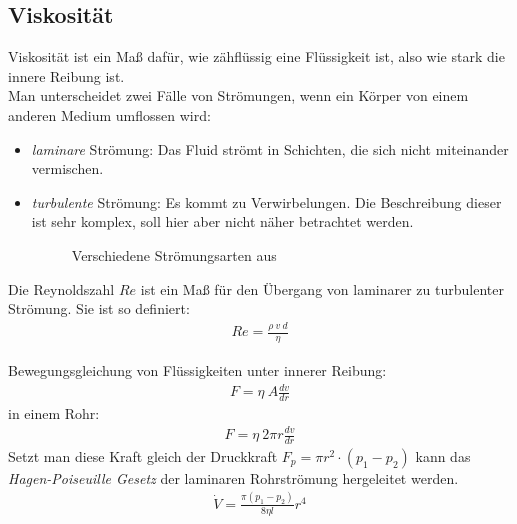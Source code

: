 \documentclass[12pt,a4paper,titlepage,headinclude,bibtotoc]{scrartcl}
\begin{document}
\subsection{Viskosität}
Viskosität ist ein Maß dafür, wie zähflüssig eine Flüssigkeit ist, also wie stark die innere Reibung ist.\\
Man unterscheidet zwei Fälle von Strömungen, wenn ein Körper von einem anderen Medium  umflossen wird:
\begin{itemize}
	\item \textit{laminare} Strömung: Das Fluid strömt in Schichten, die sich nicht miteinander vermischen. %
	\item \textit{turbulente} Strömung: Es kommt zu Verwirbelungen. Die Beschreibung dieser ist sehr komplex, soll hier aber nicht näher betrachtet werden.
\begin{figure}[htb]
  \centering
  \hfill
  \caption{Verschiedene Strömungsarten aus \cite[S. 465]{giancoli}}
  \label{fig:label-gesamt}
\end{figure}
\end{itemize}
Die Reynoldszahl $Re$ ist ein Maß für den Übergang von laminarer zu turbulenter Strömung.
Sie ist so definiert:
\begin{align}
	Re=\frac{\rho~v~d}{\eta}
\end{align}

Bewegungsgleichung von Flüssigkeiten unter innerer Reibung:
\begin{align}
	F=\eta~ A\frac{dv}{dr}
\end{align}
in einem Rohr:
\begin{align}
	F=\eta~ 2\pi r\frac{dv}{dr}
\end{align}
Setzt man diese Kraft gleich der Druckkraft $F_p=\pi r^2 \cdot (p_1-p_2)$ kann das \textit{Hagen-Poiseuille Gesetz} der laminaren Rohrströmung hergeleitet werden.\cite[S.125]{gerthsen} %
\begin{align}
	\dot{V}=\frac{\pi(p_1-p_2)}{8\eta l}r^4
\end{align}
\end{document}
